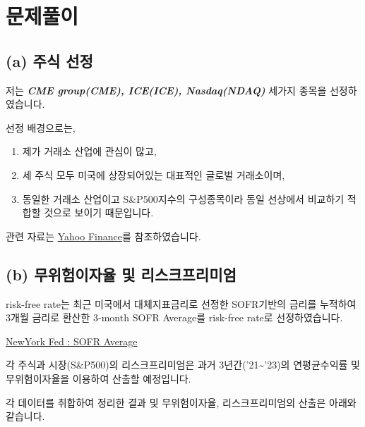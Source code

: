 \documentclass[
  letterpaper,
  DIV=11,
  numbers=noendperiod]{scrreprt}
\providecommand{\tightlist}{%
  \setlength{\itemsep}{0pt}\setlength{\parskip}{0pt}}\usepackage{longtable,booktabs,array}
\begin{document}
\section*{문제풀이}\label{uxbb38uxc81cuxd480uxc774}


\subsection*{(a) 주식 선정}\label{a-uxc8fcuxc2dd-uxc120uxc815}

저는 \textbf{\emph{CME group(CME), ICE(ICE), Nasdaq(NDAQ)}} 세가지
종목을 선정하였습니다.

선정 배경으로는,

\begin{enumerate}
\def\labelenumi{(\arabic{enumi})}
\tightlist
\item
  제가 거래소 산업에 관심이 많고,
\item
  세 주식 모두 미국에 상장되어있는 대표적인 글로벌 거래소이며,
\item
  동일한 거래소 산업이고 S\&P500지수의 구성종목이라 동일 선상에서
  비교하기 적합할 것으로 보이기 때문입니다.
\end{enumerate}

관련 자료는 \href{https://finance.yahoo.com/}{Yahoo Finance}를
참조하였습니다.

\subsection*{(b) 무위험이자율 및
리스크프리미엄}\label{b-uxbb34uxc704uxd5d8uxc774uxc790uxc728-uxbc0f-uxb9acuxc2a4uxd06cuxd504uxb9acuxbbf8uxc5c4}

risk-free rate는 최근 미국에서 대체지표금리로 선정한 SOFR기반의 금리를
누적하여 3개월 금리로 환산한 3-month SOFR Average를 risk-free rate로
선정하였습니다.

\href{https://www.newyorkfed.org/markets/reference-rates/sofr-averages-and-index}{NewYork
Fed : SOFR Average}

각 주식과 시장(S\&P500)의 리스크프리미엄은 과거
3년간('21\textasciitilde'23)의 연평균수익률 및 무위험이자율을 이용하여
산출할 예정입니다.

각 데이터를 취합하여 정리한 결과 및 무위험이자율, 리스크프리미엄의
산출은 아래와 같습니다.
\end{document}
